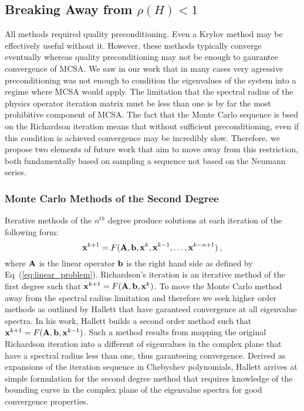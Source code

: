 \subsection{Breaking Away from $\rho(H) < 1$}
\label{subsec:future_spec_rad}

All methods required quality preconditioning. Even a Krylov method may
be effectively useful without it. However, these methods typically
converge eventually whereas quality preconditioning may not be enough
to gaurantee convergence of MCSA. We saw in our work that in many
cases very agressive preconditioning was not enough to condition the
eigenvalues of the system into a regime where MCSA would apply. The
limitation that the spectral radius of the physics operator iteration
matrix must be less than one is by far the most prohibitive component
of MCSA. The fact that the Monte Carlo sequence is bsed on the
Richardson iteration means that without sufficient preconditioning,
even if this condition is achieved convergence may be incredibly
slow. Therefore, we propose two elements of future work that aim to
move away from this restriction, both fundamentally based on sampling
a sequence not based on the Neumann series.

\subsubsection{Monte Carlo Methods of the Second Degree}
\label{subsubsec:2_degree_mc}

Iterative methods of the $n^{th}$ degree produce solutions at each
iteration of the following form:
\begin{equation}
  \mathbf{x}^{k+1} = F(\mathbf{A},\mathbf{b},\mathbf{x}^{k},\mathbf{x}^{k-1},\dots,\mathbf{x}^{k-n+1})\:,
\label{eq:nth_degree_iter}
\end{equation}
where $\mathbf{A}$ is the linear operator $\mathbf{b}$ is the right hand side
as defined by Eq~(\ref{eq:linear_problem}). Richardson's iteration is
an iterative method of the first degree such that $\mathbf{x}^{k+1} =
F(\mathbf{A},\mathbf{b},\mathbf{x}^{k})$. To move the Monte Carlo method away from
the spectral radius limitation and therefore we seek higher order
methods as outlined by Hallett \cite{hughes_hallett_second-order_1984}
that have garanteed convergence at all eigenvalue spectra. In his
work, Hallett builds a second order method such that $\mathbf{x}^{k+1} =
F(\mathbf{A},\mathbf{b},\mathbf{x}^{k-1})$. Such a method results from mapping the
original Richardson iteration into a different of eigenvalues in the
complex plane that have a spectral radius less than one, thus
garanteeing convergence. Derived as expansions of the iteration
sequence in Chebyshev polynomials, Hallett arrives at simple
formulation for the second degree method that requires knowledge of
the bounding curve in the complex plane of the eigenvalue spectra for
good convergence properties.


